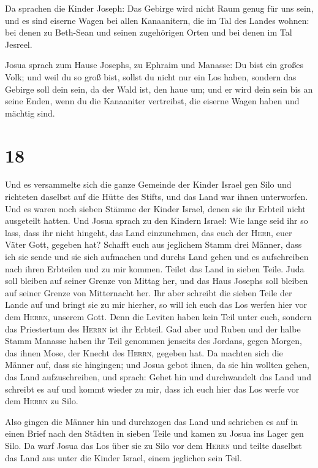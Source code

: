  Da sprachen die Kinder Joseph: Das Gebirge wird nicht
Raum genug für uns sein, und es sind eiserne Wagen bei allen
Kanaanitern, die im Tal des Landes wohnen: bei denen zu Beth-Sean und
seinen zugehörigen Orten und bei denen im Tal Jesreel.

 Josua sprach zum Hause Josephs, zu Ephraim und Manasse:
Du bist ein großes Volk; und weil du so groß bist, sollst du nicht nur
ein Los haben,  sondern das Gebirge soll dein sein, da
der Wald ist, den haue um; und er wird dein sein bis an seine Enden,
wenn du die Kanaaniter vertreibst, die eiserne Wagen haben und mächtig
sind.

\hypertarget{section-17}{%
\section{18}\label{section-17}}

 Und es versammelte sich die ganze Gemeinde der Kinder
Israel gen Silo und richteten daselbst auf die Hütte des Stifts, und das
Land war ihnen unterworfen.  Und es waren noch sieben
Stämme der Kinder Israel, denen sie ihr Erbteil nicht ausgeteilt hatten.
 Und Josua sprach zu den Kindern Israel: Wie lange seid
ihr so lass, dass ihr nicht hingeht, das Land einzunehmen, das euch der
\textsc{Herr}, euer Väter Gott, gegeben hat?  Schafft euch
aus jeglichem Stamm drei Männer, dass ich sie sende und sie sich
aufmachen und durchs Land gehen und es aufschreiben nach ihren Erbteilen
und zu mir kommen.  Teilet das Land in sieben Teile. Juda
soll bleiben auf seiner Grenze von Mittag her, und das Haus Josephs soll
bleiben auf seiner Grenze von Mitternacht her.  Ihr aber
schreibt die sieben Teile der Lande auf und bringt sie zu mir hierher,
so will ich euch das Los werfen hier vor dem \textsc{Herrn}, unserem
Gott.  Denn die Leviten haben kein Teil unter euch,
sondern das Priestertum des \textsc{Herrn} ist ihr Erbteil. Gad aber und
Ruben und der halbe Stamm Manasse haben ihr Teil genommen jenseits des
Jordans, gegen Morgen, das ihnen Mose, der Knecht des \textsc{Herrn},
gegeben hat.  Da machten sich die Männer auf, dass sie
hingingen; und Josua gebot ihnen, da sie hin wollten gehen, das Land
aufzuschreiben, und sprach: Gehet hin und durchwandelt das Land und
schreibt es auf und kommt wieder zu mir, dass ich euch hier das Los
werfe vor dem \textsc{Herrn} zu Silo.

 Also gingen die Männer hin und durchzogen das Land und
schrieben es auf in einen Brief nach den Städten in sieben Teile und
kamen zu Josua ins Lager gen Silo.  Da warf Josua das Los
über sie zu Silo vor dem \textsc{Herrn} und teilte daselbst das Land aus
unter die Kinder Israel, einem jeglichen sein Teil.

